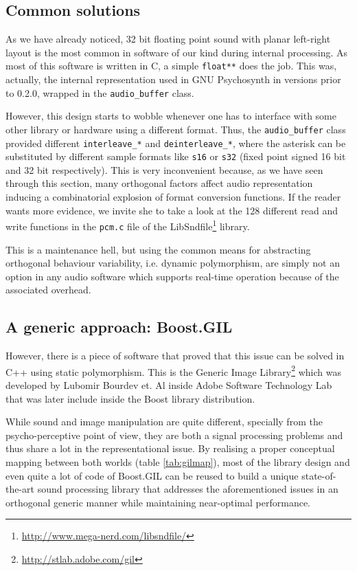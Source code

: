 \subsection{Common solutions}

As we have already noticed, 32 bit floating point sound with planar
left-right layout is the most common in software of our kind during
internal processing. As most of this software is written in C, a
simple \texttt{float**} does the job. This was, actually, the internal
representation used in GNU Psychosynth in versions prior to 0.2.0,
wrapped in the \texttt{audio\_buffer} class.

However, this design starts to wobble whenever one has to interface
with some other library or hardware using a different format. Thus,
the \texttt{audio\_buffer} class provided different
\texttt{interleave\_*} and \texttt{deinterleave\_*}, where the
asterisk can be substituted by different sample formats like
\texttt{s16} or \texttt{s32} (fixed point signed 16 bit and 32 bit
respectively). This is very inconvenient because, as we have seen
through this section, many orthogonal factors affect audio
representation inducing a combinatorial explosion of format conversion
functions. If the reader wants more evidence, we invite she to take a
look at the 128 different read and write functions in the
\texttt{pcm.c} file of the
LibSndfile\footnote{\url{http://www.mega-nerd.com/libsndfile/}}
library.

This is a maintenance hell, but using the common means for abstracting
orthogonal behaviour variability, i.e. dynamic
polymorphism, are simply not an option in
any audio software which supports real-time operation because of the
associated overhead.

\subsection{A generic approach: Boost.GIL}

However, there is a piece of software that proved that this issue can
be solved in C++ using static
polymorphism. This is the Generic Image
Library\footnote{\url{http://stlab.adobe.com/gil}} which was developed
by Lubomir Bourdev et. Al inside Adobe Software Technology Lab that
was later include inside the Boost library
distribution. 

While sound and image manipulation are quite different, specially from
the psycho-perceptive point of view, they are both a signal processing
problems and thus share a lot in the representational issue. By
realising a proper conceptual mapping between both worlds (table
\ref{tab:gilmap}), most of the library design and even quite a lot of
code of Boost.GIL can be reused to build a unique state-of-the-art
sound processing library that addresses the aforementioned issues in
an orthogonal generic manner while maintaining near-optimal
performance.

